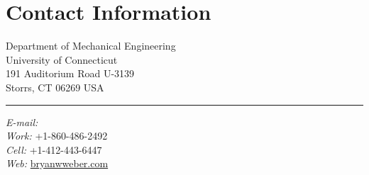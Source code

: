 
%
%
\setmainfont[Path = fonts/ ,
             Ligatures = Common ,
             Extension = .otf ,
             BoldFont = Andada-Bold ,
             ItalicFont = Andada-Italic ,
             SmallCapsFont = AndadaSC-Regular
]
{Andada-Regular}
\newfontface{}
\newfontface{}



\listoftodos
\vspace{1em}

\section{{\sectionfont Contact Information}}

%
\newlength{\rcolwidth}
\setlength{\rcolwidth}{2.5in}%
\newlength{\ccolwidth}
\setlength{\ccolwidth}{1pt}
\newlength{\lcolwidth}
\setlength{\lcolwidth}{\textwidth-\rcolwidth-\ccolwidth}
%
\begin{varwidth}{\lcolwidth}%
Department of Mechanical Engineering\\
University of Connecticut\\
191 Auditorium Road U-3139\\
Storrs, CT 06269 USA%
\end{varwidth}%
\hfill
\begin{varwidth}{\ccolwidth}
\rule{0.5pt}{4\baselineskip} %
\end{varwidth}%
\hfill
\begin{varwidth}{\rcolwidth}%
\textit{E-mail:} \\
\textit{Work:} +1-860-486-2492 \\
\textit{Cell:} +1-412-443-6447 \\
\textit{Web:} \href{http://bryanwweber.com}{bryanwweber.com}
\end{varwidth}%

